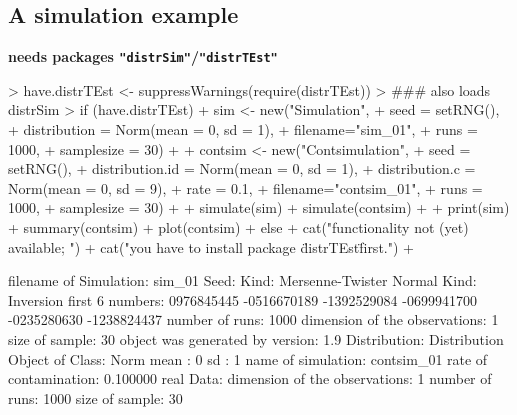 \documentclass[11pt]{article}
\newcommand{\pkg}[1]{{\tt "#1"}}
\begin{document}
\subsection{A simulation example}\label{simex}
{\bf needs packages \pkg{distrSim}/\pkg{distrTEst}}\\[2ex]
\begin{Schunk}
\begin{Sinput}
> have.distrTEst <- suppressWarnings(require(distrTEst)) 
>     ### also loads distrSim
> if (have.distrTEst)
+    { sim <- new("Simulation",
+                 seed = setRNG(),
+                 distribution = Norm(mean = 0, sd = 1),
+                 filename="sim_01",
+                 runs = 1000,
+                 samplesize = 30)
+      
+      contsim <- new("Contsimulation",
+                     seed = setRNG(),
+                     distribution.id = Norm(mean = 0, sd = 1),
+                     distribution.c = Norm(mean = 0, sd = 9),
+                     rate = 0.1,
+                     filename="contsim_01",
+                     runs = 1000,
+                     samplesize = 30)
+      
+      simulate(sim)
+      simulate(contsim)
+      
+      print(sim)
+      summary(contsim)
+      plot(contsim)
+    } else {
+     cat("\n functionality not (yet) available; ")
+     cat("you have to install package \"distrTEst\" first.\n")
+    }
\end{Sinput}
\begin{Soutput}
filename of Simulation: sim_01
Seed:  Kind: Mersenne-Twister
       Normal Kind: Inversion
       first 6 numbers:  0976845445	-0516670189	-1392529084
                        -0699941700	-0235280630	-1238824437
number of runs: 1000
dimension of the observations: 1
size of sample: 30
object was generated by version: 1.9
Distribution:
Distribution Object of Class: Norm
mean :  0 
sd :  1 
name of simulation: contsim_01
rate of contamination: 0.100000
real Data:
dimension of the observations: 1
number of runs: 1000
size of sample: 30
\end{Soutput}
\end{Schunk}
\end{document}
